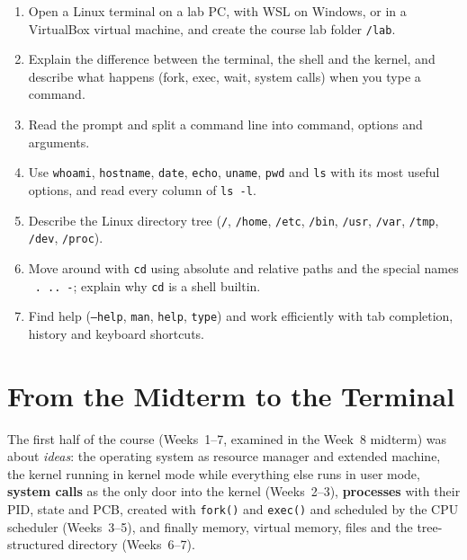 \documentclass[11pt,a4paper]{article}
\newcommand{\term}[1]{\textbf{\color{mintdeep}#1}}
\newcommand{\cmd}[1]{\texttt{#1}}
\begin{document}
\vspace{0.8em}
\begin{keyidea}
\begin{enumerate}[leftmargin=1.4em]
  \item Open a Linux terminal on a lab PC, with WSL on Windows, or in a VirtualBox virtual machine, and create the course lab folder \texttt{\tl/lab}.
  \item Explain the difference between the terminal, the shell and the kernel, and describe what happens (fork, exec, wait, system calls) when you type a command.
  \item Read the prompt and split a command line into command, options and arguments.
  \item Use \cmd{whoami}, \cmd{hostname}, \cmd{date}, \cmd{echo}, \cmd{uname}, \cmd{pwd} and \cmd{ls} with its most useful options, and read every column of \cmd{ls -l}.
  \item Describe the Linux directory tree (\texttt{/}, \texttt{/home}, \texttt{/etc}, \texttt{/bin}, \texttt{/usr}, \texttt{/var}, \texttt{/tmp}, \texttt{/dev}, \texttt{/proc}).
  \item Move around with \cmd{cd} using absolute and relative paths and the special names \texttt{\tl}\ \texttt{.}\ \texttt{..}\ \texttt{-}; explain why \cmd{cd} is a shell builtin.
  \item Find help (\cmd{--help}, \cmd{man}, \cmd{help}, \cmd{type}) and work efficiently with tab completion, history and keyboard shortcuts.
\end{enumerate}
\end{keyidea}

\setcounter{tocdepth}{1}
\tableofcontents

\section{From the Midterm to the Terminal}

The first half of the course (Weeks~1--7, examined in the Week~8 midterm) was about \emph{ideas}: the operating system as resource manager and extended machine, the kernel running in kernel mode while everything else runs in user mode, \term{system calls} as the only door into the kernel (Weeks~2--3), \term{processes} with their PID, state and PCB, created with \cmd{fork()} and \cmd{exec()} and scheduled by the CPU scheduler (Weeks~3--5), and finally memory, virtual memory, files and the tree-structured directory (Weeks~6--7).
\end{document}
